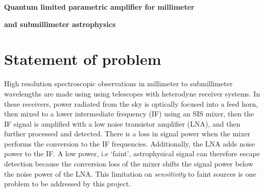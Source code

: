 






\centerline{\textbf{Quantum limited parametric amplifier for millimeter}}
\centerline{\textbf{and submillimeter astrophysics}}


\begin{abstract}
This proposal is to develop a technology that would significantly improve the noise performance and available instantaneous bandwidth for coherent receivers operating up to $\approx$ 1 THz, i.e (sub)millimeter wavelengths. We propose to build a Traveling-wave Kinetic Inductance Parametric Amplifier (TKIP) to provide gain before mixer down conversion. The TKIP can provide quantum limited noise performance across an octave bandwidth, which relaxes the requirements on the mixer and afterwards. Although the TKIP could be used in receivers at a variety of facilities, (e.g SOFIA, CCAT), we propose to demonstrate its capabilities in an ALMA band 3 receiver, \SIrange{80}{116}{GHz}. Here, use of the TKIP would mean a factor $\approx$ 2 better noise and factor $\ge$ 5 broader instantaneous bandwidth. Such improvement in receiver performance would accelerate pursuit of and provide new access to scientific objectives at these wavelengths.
\end{abstract}


\section{Statement of problem}
High resolution spectroscopic observations in millimeter to submillimeter wavelengths are made using using telescopes with heterodyne receiver systems. In these receivers, power radiated from the sky is optically focused into a feed horn, then mixed to a lower intermediate frequency (IF) using an SIS mixer, then the IF signal is amplified with a low noise transistor amplifier (LNA), and then further processed and detected. There is a loss in signal power when the mixer performs the conversion to the IF frequencies. Additionally, the LNA adds noise power to the IF. A low power, i.e `faint', astrophysical signal can therefore escape detection because the conversion loss of the mixer shifts the signal power below the noise power of the LNA. This limitation on \emph{sensitivity} to faint sources is one problem to be addressed by this project.


